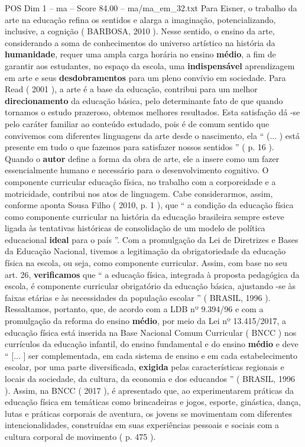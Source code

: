 \begin{textsample}{POS Dim 1 – ma – Score 84.00 – ma/ma\_em\_32.txt}
Para Eisner, o trabalho da arte na educação refina os sentidos e alarga a imaginação, potencializando, inclusive, a cognição ( BARBOSA, 2010 ).
Nesse sentido, o ensino da arte, considerando a soma de conhecimentos do universo artístico na história da \textbf{humanidade}, requer uma ampla carga horária no ensino \textbf{médio}, a fim de garantir aos estudantes, no espaço da escola, uma \textbf{indispensável} aprendizagem em arte e seus \textbf{desdobramentos} para um pleno convívio em sociedade.
Para Read ( 2001 ), a arte é a base da educação, contribui para um melhor \textbf{direcionamento} da educação básica, pelo determinante fato de que quando tornamos o estudo prazeroso, obtemos melhores resultados.
Esta satisfação dá -se pelo caráter familiar ao conteúdo estudado, pois é de comum sentido que convivemos com diferentes linguagens da arte desde o nascimento, ela “ (... ) está presente em tudo o que fazemos para satisfazer nossos sentidos ” ( p. 16 ).
Quando o \textbf{autor} define a forma da obra de arte, ele a insere como um fazer essencialmente humano e necessário para o desenvolvimento cognitivo.
O componente curricular educação física, no trabalho com a corporeidade e a motricidade, contribui nos atos de linguagem.
Cabe considerarmos, assim, conforme aponta Sousa Filho ( 2010, p. 1 ), que “ a condição da educação física como componente curricular na história da educação brasileira sempre esteve ligada às tentativas históricas de consolidação de um modelo de política educacional \textbf{ideal} para o país ”.
Com a promulgação da Lei de Diretrizes e Bases da Educação Nacional, tivemos a legitimação da obrigatoriedade da educação física na escola, ou seja, como componente curricular.
Assim, com base no seu art. 26, \textbf{verificamos} que “ a educação física, integrada à proposta pedagógica da escola, é componente curricular obrigatório da educação básica, ajustando -se às faixas etárias e às necessidades da população escolar ” ( BRASIL, 1996 ).
Ressaltamos, portanto, que, de acordo com a LDB nº 9.394/96 e com a promulgação da reforma do ensino \textbf{médio}, por meio da Lei nº 13.415/2017, a educação física está inserida na Base Nacional Comum Curricular ( BNCC ) nos currículos da educação infantil, do ensino fundamental e do ensino \textbf{médio} e deve “ [... ] ser complementada, em cada sistema de ensino e em cada estabelecimento escolar, por uma parte diversificada, \textbf{exigida} pelas características regionais e locais da sociedade, da cultura, da economia e dos educandos ” ( BRASIL, 1996 ).
Assim, na BNCC ( 2017 ), é apresentado que, ao experimentarem práticas da educação física em temáticas como brincadeiras e jogos, esporte, ginástica, dança, lutas e práticas corporais de aventura, os jovens se movimentam com diferentes intencionalidades, construídas em suas experiências pessoais e sociais com a cultura corporal de movimento ( p. 475 ).

\end{textsample}

